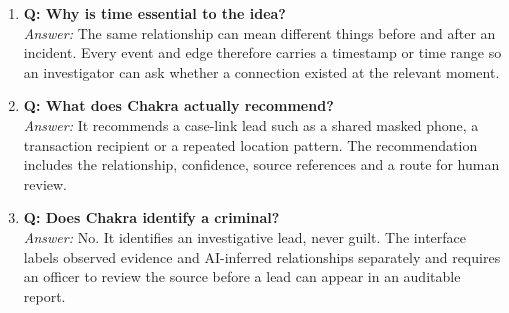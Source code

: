 \documentclass[10pt,a4paper]{article}
\newcommand{\qa}[2]{\item \textbf{\color{navy}Q: #1}\\[-1pt]{\color{coral}\textit{Answer:}} #2}
\begin{document}
\begin{enumerate}
\qa{Why is time essential to the idea?}{The same relationship can mean different things before and after an incident. Every event and edge therefore carries a timestamp or time range so an investigator can ask whether a connection existed at the relevant moment.}
\qa{What does Chakra actually recommend?}{It recommends a case-link lead such as a shared masked phone, a transaction recipient or a repeated location pattern. The recommendation includes the relationship, confidence, source references and a route for human review.}
\qa{Does Chakra identify a criminal?}{No. It identifies an investigative lead, never guilt. The interface labels observed evidence and AI-inferred relationships separately and requires an officer to review the source before a lead can appear in an auditable report.}
\end{enumerate}
\end{document}
